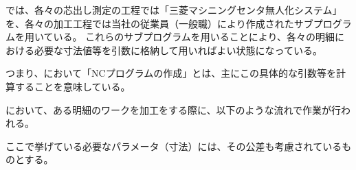 \noindent
\MMC では、各々の芯出し測定の工程では「三菱マシニングセンタ無人化システム」を、各々の加工工程では当社の従業員（一般職）により作成されたサブプログラムを用いている。
これらのサブプログラムを用いることにより、各々の明細における必要な寸法値等を引数に格納して用いればよい状態になっている。
\begin{marker}
つまり、\MMC において「NCプログラムの作成」とは、主にこの具体的な引数等を計算することを意味している。
\end{marker}



\clearpage
\MMC において、ある明細のワークを加工をする際に、以下のような流れで作業が行われる。
\begin{marker}
ここで挙げている必要なパラメータ（寸法）には、その公差も考慮されているものとする。
\end{marker}


